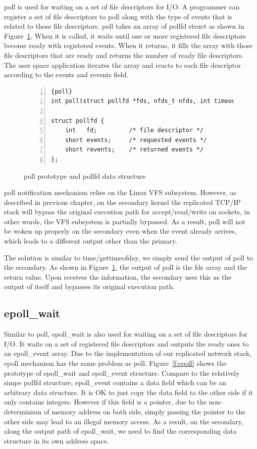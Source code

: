 poll is used for waiting on a set of file descriptors for I/O. A programmer can register a set of file descriptors to poll along with the type of events that is related to those file descriptors. poll takes an array of pollfd struct as shown in Figure~\ref{f:pollfd}. When it is called, it waits until one or more registered file descriptors become ready with registered events. When it returns, it fills the array with those file descriptors that are ready and returns the number of ready file descriptors. The user space application iterates the array and reacts to each file descriptor according to the events and revents field.

\begin{figure}
\begin{lstlisting}[numbers=left, frame=single, basicstyle=\small, breaklines]{poll}
int poll(struct pollfd *fds, nfds_t nfds, int timeout);

struct pollfd {
    int   fd;         /* file descriptor */
    short events;     /* requested events */
    short revents;    /* returned events */
};
\end{lstlisting}
\caption{poll prototype and pollfd data structure}
\label{f:pollfd}
\end{figure}

poll notification mechanism relies on the Linux VFS subsystem. However, as described in previous chapter, on the secondary kernel the replicated TCP/IP stack will bypass the original execution path for accept/read/write on sockets, in other words, the VFS subsystem is partially bypassed. As a result, poll will not be woken up properly on the secondary even when the event already arrives, which leads to a different output other than the primary.

The solution is similar to time/gettimeofday, we simply send the output of poll to the secondary. As shown in Figure~\ref{f:pollfd}, the output of poll is the fds array and the return value. Upon receives the information, the secondary uses this as the output of itself and bypasses its original execution path.

\subsection{epoll\_wait}
Similar to poll, epoll\_wait is also used for waiting on a set of file descriptors for I/O. It waits on a set of registered file descriptors and outputs the ready ones to an epoll\_event array. Due to the implementation of our replicated network stack, epoll mechanism has the same problem as poll. Figure~\ref{f:epoll} shows the prototype of epoll\_wait and epoll\_event structure. Compare to the relatively simpe pollfd structure, epoll\_event contains a data field which can be an arbitrary data structure. It is OK to just copy the data field to the other side if it only contains integers. However if this field is a pointer, due to the non-determinism of memory address on both side, simply passing the pointer to the other side may lead to an illegal memory access. As a result, on the secondary, along the output path of epoll\_wait, we need to find the corresponding data structure in its own address space.

